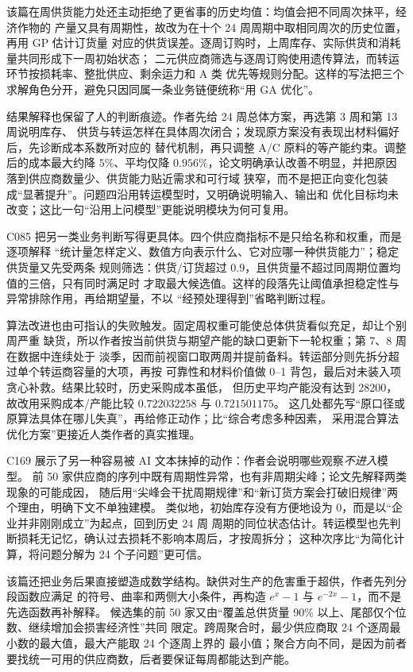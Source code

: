 \documentclass[UTF8,a4paper,12pt]{ctexart}
\begin{document}
该篇在周供货能力处还主动拒绝了更省事的历史均值：均值会把不同周次抹平，经济作物的
产量又具有周期性，故改为在十个 24 周周期中取相同周次的历史位置，再用 GP 估计订货量
对应的供货误差。逐周订购时，上周库存、实际供货和消耗量共同形成下一周初始状态；
二元供应商筛选与逐周订购使用遗传算法，而转运环节按损耗率、整批供应、剩余运力和 A 类
优先等规则分配。这样的写法把三个求解角色分开，避免只因同属一条业务链便统称“用 GA
优化”。

结果解释也保留了人的判断痕迹。作者先给 24 周总体方案，再选第 3 周和第 13 周说明库存、
供货与转运怎样在具体周次闭合；发现原方案没有表现出材料偏好后，先诊断成本系数所对应的
替代机制，再只调整 A/C 原料的等产能约束。调整后的成本最大约降 $5\%$、平均仅降
$0.956\%$，论文明确承认改善不明显，并把原因落到供应商数量少、供货能力贴近需求和可行域
狭窄，而不是把正向变化包装成“显著提升”。问题四沿用转运模型时，又明确说明输入、输出和
优化目标均未改变；这比一句“沿用上问模型”更能说明模块为何可复用。

C085 把另一类业务判断写得更具体。四个供应商指标不是只给名称和权重，而是逐项解释
“统计量怎样定义、数值方向表示什么、它对应哪一种供货能力”；稳定供货量又先受两条
规则筛选：供货/订货超过 $0.9$，且供货量不超过同周期位置均值的三倍，只有同时满足时
才取最大候选值。这样的段落先让阈值承担稳定性与异常排除作用，再给期望量，不以
“经预处理得到”省略判断过程。

算法改进也由可指认的失败触发。固定周权重可能使总体供货看似充足，却让个别周严重
缺货，所以作者按当前供货与期望产能的缺口更新下一轮权重；第 7、8 周在数据中连续处于
淡季，因而前视窗口取两周并提前备料。转运部分则先拆分超过单个转运商容量的大项，再按
可靠性和材料价值做 0--1 背包，最后对未装入项贪心补救。结果比较时，历史采购成本虽低，
但历史平均产能没有达到 28200，故改用采购成本/产能比较 $0.722032258$ 与 $0.721501175$。
这几处都先写“原口径或原算法具体在哪儿失真”，再给修正动作；比“综合考虑多种因素，
采用混合算法优化方案”更接近人类作者的真实推理。

C169 展示了另一种容易被 AI 文本抹掉的动作：作者会说明哪些观察\emph{不进入}模型。
前 50 家供应商的序列中既有周期性异常，也有非周期尖峰；论文先解释两类现象的可能成因，
随后用“尖峰会干扰周期规律”和“新订货方案会打破旧规律”两个理由，明确下文不单独建模。
类似地，初始库存没有方便地设为 0，而是以“企业并非刚刚成立”为起点，回到历史 24 周
周期的同位状态估计。转运模型也先判断损耗无记忆，确认过去损耗不影响本周后，才按周拆分；
这种次序比“为简化计算，将问题分解为 24 个子问题”更可信。

该篇还把业务后果直接塑造成数学结构。缺供对生产的危害重于超供，作者先列分段函数应满足
的符号、曲率和两侧大小条件，再构造 $e^x-1$ 与 $e^{-2x}-1$，而不是先选函数再补解释。
候选集的前 50 家又由“覆盖总供货量 90\% 以上、尾部仅个位数、继续增加会损害经济性”共同
限定。跨周聚合时，最少供应商取 24 个逐周最小数的最大值，最大产能取 24 个逐周上界的
最小值；聚合方向不同，是因为前者要找统一可用的供应商数，后者要保证每周都能达到产能。
\end{document}
